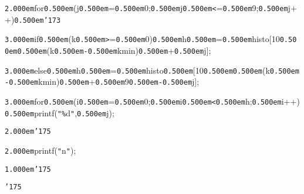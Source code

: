 \documentclass[uplatex,a4paper]{jsarticle}
\begin{document}
\noindent
{\tt\mc \kern2.000em}for{\tt\mc \kern0.500em}(j{\tt\mc \kern0.500em}={\tt\mc \kern0.500em}0;{\tt\mc \kern0.500em}j{\tt\mc \kern0.500em}{\tt <}={\tt\mc \kern0.500em}9;{\tt\mc \kern0.500em}j++){\tt\mc \kern0.500em}{\tt\char'173}

\noindent
{\tt\mc \kern3.000em}if{\tt\mc \kern0.500em}(k{\tt\mc \kern0.500em}{\tt >}={\tt\mc \kern0.500em}0){\tt\mc \kern0.500em}h{\tt\mc \kern0.500em}={\tt\mc \kern0.500em}histo[10{\tt\mc \kern0.500em}{\tt *}{\tt\mc \kern0.500em}(k{\tt\mc \kern0.500em}{\tt -}{\tt\mc \kern0.500em}kmin){\tt\mc \kern0.500em}+{\tt\mc \kern0.500em}j];

\noindent
{\tt\mc \kern3.000em}else{\tt\mc \kern0.500em}h{\tt\mc \kern0.500em}={\tt\mc \kern0.500em}histo{\tt\mc \kern0.500em}[10{\tt\mc \kern0.500em}{\tt *}{\tt\mc \kern0.500em}(k{\tt\mc \kern0.500em}{\tt -}{\tt\mc \kern0.500em}kmin){\tt\mc \kern0.500em}+{\tt\mc \kern0.500em}9{\tt\mc \kern0.500em}{\tt -}{\tt\mc \kern0.500em}j];

\noindent
{\tt\mc \kern3.000em}for{\tt\mc \kern0.500em}(i{\tt\mc \kern0.500em}={\tt\mc \kern0.500em}0;{\tt\mc \kern0.500em}i{\tt\mc \kern0.500em}{\tt <}{\tt\mc \kern0.500em}h;{\tt\mc \kern0.500em}i++){\tt\mc \kern0.500em}printf({\tt "}{\tt\%}d{\tt "},{\tt\mc \kern0.500em}j);

\noindent
{\tt\mc \kern2.000em}{\tt\char'175}

\noindent
{\tt\mc \kern2.000em}printf({\tt "}{\tt{}}n{\tt "});

\noindent
{\tt\mc \kern1.000em}{\tt\char'175}

\noindent
{\tt\char'175}

\noindent
\hfill

\noindent
\end{document}
